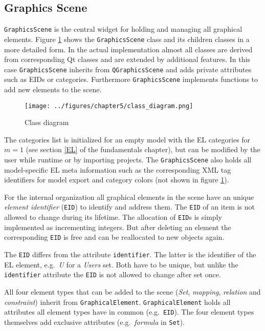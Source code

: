 \documentclass[twoside, openright, 12pt]{book}
\begin{document}
\subsection{Graphics Scene}
\label{implementation_graphicsscene}
\texttt{GraphicsScene} is the central widget for holding and managing all graphical elements.
Figure \ref{fig:class_diagram} shows the \texttt{GraphicsScene} class and its children classes in a more detailed form.
In the actual implementation almost all classes are derived from corresponding Qt classes and are extended by additional features.
In this case \texttt{GraphicsScene} inherits from \texttt{QGraphicsScene} and adds private attributes such as EIDs or categories.
Furthermore \texttt{GraphicsScene} implements functions to add new elements to the scene.

\begin{figure}[htb]
	\centering
	\texttt{[image: ../figures/chapter5/class\_diagram.png]}
	\caption{Class diagram}
	\label{fig:class_diagram}
\end{figure}

\noindent
The categories list is initialized for an empty model with the EL categories for $m=1$ (see section \ref{EL} of the fundamentals chapter), but can be modified by the user while runtime or by importing projects.
The \texttt{GraphicsScene} also holds all model-specific EL meta information such as the corresponding XML tag identifiers for model export and category colors (not shown in figure \ref{fig:class_diagram}).

For the internal organization all graphical elements in the scene have an unique \textit{element identifier} (\texttt{EID}) to identify and address them.
The \texttt{EID} of an item is not allowed to change during its lifetime.
The allocation of \texttt{EID}s is simply implemented as incrementing integers.
But after deleting an element the corresponding \texttt{EID} is free and can be reallocated to new objects again.

\begin{mdframed}[style=mystyle,frametitle=Note]
The \texttt{EID} differs from the attribute \texttt{identifier}.
The latter is the identifier of the EL element, e.g.\ \textit{U} for a \textit{Users} set.
Both have to be unique, but unlike the \texttt{identifier} attribute the \texttt{EID} is not allowed to change after set once.
\end{mdframed}

\noindent
All four element types that can be added to the scene (\textit{Set}, \textit{mapping}, \textit{relation} and \textit{constraint}) inherit from \texttt{GraphicalElement}.
\texttt{GraphicalElement} holds all attributes all element types have in common (e.g.\ \texttt{EID}).
The four element types themselves add exclusive attributes (e.g.\ \textit{formula} in \texttt{Set}).
\end{document}
